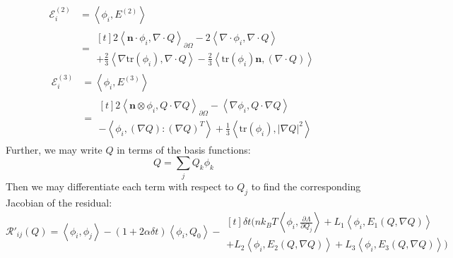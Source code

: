 \documentclass[reqno]{article}
\begin{document}
\begin{equation}
    \begin{split}
        \mathcal{E}^{(2)}_i
        &=
        \left< \phi_i, E^{(2)} \right> \\
        &=
        \begin{multlined}[t]
            2 \left< \mathbf{n} \cdot \phi_i, \nabla \cdot Q \right>_{\partial \Omega}
            - 2 \left< \nabla \cdot \phi_i, \nabla \cdot Q \right> \\
            + \tfrac23 \left< \nabla \text{tr}(\phi_i), \nabla \cdot Q \right>
            - \tfrac23 \left< \text{tr}(\phi_i) \mathbf{n}, \left(\nabla \cdot Q \right) \right>
        \end{multlined}
    \end{split}
\end{equation}
\begin{equation}
    \begin{split}
        \mathcal{E}^{(3)}_i
        &=
        \left< \phi_i, E^{(3)} \right> \\
        &=
        \begin{multlined}[t]
            2 \left< \mathbf{n} \otimes \phi_i, Q \cdot \nabla Q \right>_{\partial \Omega}
            - \left< \nabla \phi_i, Q \cdot \nabla Q \right> \\
            - \left< \phi_i, (\nabla Q) : (\nabla Q)^T \right>
            + \tfrac13 \left< \text{tr}(\phi_i), \left| \nabla Q \right|^2 \right>
        \end{multlined}
    \end{split}
\end{equation}
Further, we may write $Q$ in terms of the basis functions:
\begin{equation}
    Q = \sum_j Q_k \phi_k
\end{equation}
Then we may differentiate each term with respect to $Q_j$ to find the corresponding Jacobian of the residual:
\begin{equation}
    \mathcal{R}'_{ij}(Q)
    =
    \left<\phi_i, \phi_j\right>
    - \left(1 + 2 \alpha \delta t \right) \left<\phi_i, Q_0\right>
    -
    \begin{multlined}[t]
    \delta t \bigl(
        n k_B T \left<\phi_i, \frac{\partial \Lambda}{\partial Q_j} \right>
        + L_1 \left<\phi_i, E_1(Q, \nabla Q)\right> \\
        + L_2 \left<\phi_i, E_2(Q, \nabla Q)\right>
        + L_3 \left<\phi_i, E_3(Q, \nabla Q)\right>
    \bigr)
    \end{multlined}
\end{equation}
\end{document}
